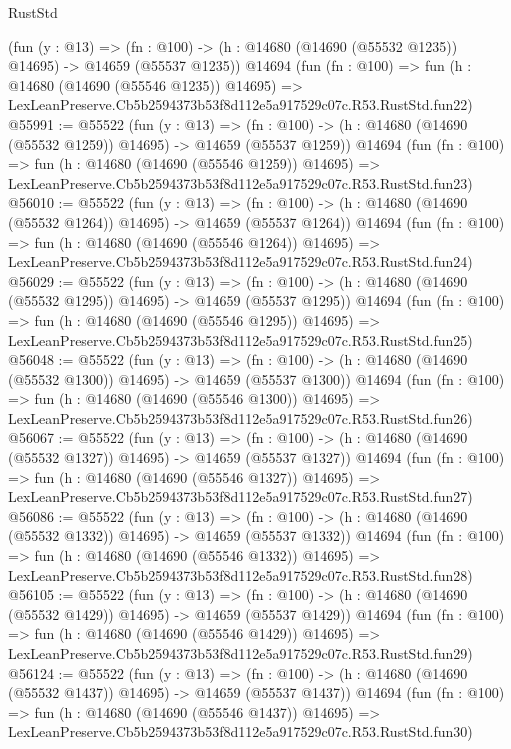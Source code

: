 \begin{lexlean}{RustStd}
\begin{coremodule}
    (fun (y : @13) =>
    (fn : @100) -> (h : @14680 (@14690 (@55532 @1235)) @14695) -> @14659 (@55537 @1235))
    @14694
    (fun (fn : @100) =>
    fun (h : @14680 (@14690 (@55546 @1235)) @14695) =>
    LexLeanPreserve.Cb5b2594373b53f8d112e5a917529c07c.R53.RustStd.fun22)
@55991 := @55522
    (fun (y : @13) =>
    (fn : @100) -> (h : @14680 (@14690 (@55532 @1259)) @14695) -> @14659 (@55537 @1259))
    @14694
    (fun (fn : @100) =>
    fun (h : @14680 (@14690 (@55546 @1259)) @14695) =>
    LexLeanPreserve.Cb5b2594373b53f8d112e5a917529c07c.R53.RustStd.fun23)
@56010 := @55522
    (fun (y : @13) =>
    (fn : @100) -> (h : @14680 (@14690 (@55532 @1264)) @14695) -> @14659 (@55537 @1264))
    @14694
    (fun (fn : @100) =>
    fun (h : @14680 (@14690 (@55546 @1264)) @14695) =>
    LexLeanPreserve.Cb5b2594373b53f8d112e5a917529c07c.R53.RustStd.fun24)
@56029 := @55522
    (fun (y : @13) =>
    (fn : @100) -> (h : @14680 (@14690 (@55532 @1295)) @14695) -> @14659 (@55537 @1295))
    @14694
    (fun (fn : @100) =>
    fun (h : @14680 (@14690 (@55546 @1295)) @14695) =>
    LexLeanPreserve.Cb5b2594373b53f8d112e5a917529c07c.R53.RustStd.fun25)
@56048 := @55522
    (fun (y : @13) =>
    (fn : @100) -> (h : @14680 (@14690 (@55532 @1300)) @14695) -> @14659 (@55537 @1300))
    @14694
    (fun (fn : @100) =>
    fun (h : @14680 (@14690 (@55546 @1300)) @14695) =>
    LexLeanPreserve.Cb5b2594373b53f8d112e5a917529c07c.R53.RustStd.fun26)
@56067 := @55522
    (fun (y : @13) =>
    (fn : @100) -> (h : @14680 (@14690 (@55532 @1327)) @14695) -> @14659 (@55537 @1327))
    @14694
    (fun (fn : @100) =>
    fun (h : @14680 (@14690 (@55546 @1327)) @14695) =>
    LexLeanPreserve.Cb5b2594373b53f8d112e5a917529c07c.R53.RustStd.fun27)
@56086 := @55522
    (fun (y : @13) =>
    (fn : @100) -> (h : @14680 (@14690 (@55532 @1332)) @14695) -> @14659 (@55537 @1332))
    @14694
    (fun (fn : @100) =>
    fun (h : @14680 (@14690 (@55546 @1332)) @14695) =>
    LexLeanPreserve.Cb5b2594373b53f8d112e5a917529c07c.R53.RustStd.fun28)
@56105 := @55522
    (fun (y : @13) =>
    (fn : @100) -> (h : @14680 (@14690 (@55532 @1429)) @14695) -> @14659 (@55537 @1429))
    @14694
    (fun (fn : @100) =>
    fun (h : @14680 (@14690 (@55546 @1429)) @14695) =>
    LexLeanPreserve.Cb5b2594373b53f8d112e5a917529c07c.R53.RustStd.fun29)
@56124 := @55522
    (fun (y : @13) =>
    (fn : @100) -> (h : @14680 (@14690 (@55532 @1437)) @14695) -> @14659 (@55537 @1437))
    @14694
    (fun (fn : @100) =>
    fun (h : @14680 (@14690 (@55546 @1437)) @14695) =>
    LexLeanPreserve.Cb5b2594373b53f8d112e5a917529c07c.R53.RustStd.fun30)

\end{coremodule}
\end{lexlean}
